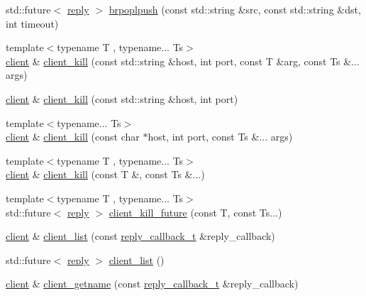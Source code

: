 \begin{DoxyCompactItemize}
\item 
std\+::future$<$ \hyperlink{classcpp__redis_1_1reply}{reply} $>$ \hyperlink{classcpp__redis_1_1client_aa30b9303ee0d59b07dd656db2426547e}{brpoplpush} (const std\+::string \&src, const std\+::string \&dst, int timeout)
\item 
{\footnotesize template$<$typename T , typename... Ts$>$ }\\\hyperlink{classcpp__redis_1_1client}{client} \& \hyperlink{classcpp__redis_1_1client_ae4090830d1710276c33ff5a74eba2e4b}{client\+\_\+kill} (const std\+::string \&host, int port, const T \&arg, const Ts \&... args)
\item 
\hyperlink{classcpp__redis_1_1client}{client} \& \hyperlink{classcpp__redis_1_1client_a3163e1f29d65a5e7b0d4165be154fb96}{client\+\_\+kill} (const std\+::string \&host, int port)
\item 
{\footnotesize template$<$typename... Ts$>$ }\\\hyperlink{classcpp__redis_1_1client}{client} \& \hyperlink{classcpp__redis_1_1client_a38df8e614a5ac9533a1993b7dec7be6b}{client\+\_\+kill} (const char $\ast$host, int port, const Ts \&... args)
\item 
{\footnotesize template$<$typename T , typename... Ts$>$ }\\\hyperlink{classcpp__redis_1_1client}{client} \& \hyperlink{classcpp__redis_1_1client_a1e2dd6cdcdb4307ceda0f866fe0a154f}{client\+\_\+kill} (const T \&, const Ts \&...)
\item 
{\footnotesize template$<$typename T , typename... Ts$>$ }\\std\+::future$<$ \hyperlink{classcpp__redis_1_1reply}{reply} $>$ \hyperlink{classcpp__redis_1_1client_ae6f09b6c022c910b79fb90a47291f511}{client\+\_\+kill\+\_\+future} (const T, const Ts...)
\item 
\hyperlink{classcpp__redis_1_1client}{client} \& \hyperlink{classcpp__redis_1_1client_a9c2e307ab54f42ce50bdd42e1c6a363b}{client\+\_\+list} (const \hyperlink{classcpp__redis_1_1client_a061a1140d36d2eaeda82b09a0bb3f9f2}{reply\+\_\+callback\+\_\+t} \&reply\+\_\+callback)
\item 
std\+::future$<$ \hyperlink{classcpp__redis_1_1reply}{reply} $>$ \hyperlink{classcpp__redis_1_1client_a0480140cc584e6dd2a0a6fab9da10cc5}{client\+\_\+list} ()
\item 
\hyperlink{classcpp__redis_1_1client}{client} \& \hyperlink{classcpp__redis_1_1client_ac4e058eaa75eb04c7a8017a779d5015e}{client\+\_\+getname} (const \hyperlink{classcpp__redis_1_1client_a061a1140d36d2eaeda82b09a0bb3f9f2}{reply\+\_\+callback\+\_\+t} \&reply\+\_\+callback)

\end{DoxyCompactItemize}
